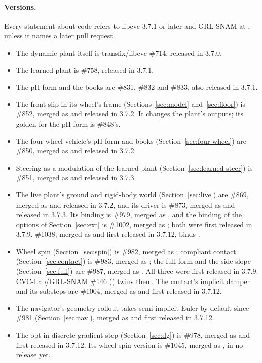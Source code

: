 \documentclass[11pt]{article}
\theoremstyle{remark}
\begin{document}
\paragraph{Versions.} Every statement about code refers to libcvc 3.7.1 or later and GRL-SNAM
 at , unless it names a later pull request.
\begin{itemize}
  \item The dynamic plant itself is transfix/libcvc \#714, released in 3.7.0.
  \item The learned plant is \#758, released in 3.7.1.
  \item The pH form and the books are \#831, \#832 and \#833, also released in 3.7.1.
  \item The front slip in its wheel's frame (Sections~\ref{sec:model} and~\ref{sec:floor}) is
        \#852, merged as  and released in 3.7.2. It changes the plant's outputs;
        its golden for the pH form is \#848's.
  \item The four-wheel vehicle's pH form and books (Section~\ref{sec:four-wheel}) are \#850, merged
        as  and released in 3.7.2.
  \item Steering as a modulation of the learned plant (Section~\ref{sec:learned-steer}) is \#851,
        merged as  and released in 3.7.3.
  \item The live plant's ground and rigid-body world (Section~\ref{sec:live}) are \#869, merged as
         and released in 3.7.2, and its driver is \#873, merged as 
        and released in 3.7.3. Its  binding is \#979, merged as , and
        the binding of the options of Section~\ref{sec:ext} is \#1002, merged as ;
        both were first released in 3.7.9. \#1038, merged as  and first released
        in 3.7.12, binds .
  \item Wheel spin (Section~\ref{sec:spin}) is \#982, merged as ; compliant contact
        (Section~\ref{sec:contact}) is \#983, merged as ; the full form and the side
        slope (Section~\ref{sec:full}) are \#987, merged as . All three were first
        released in 3.7.9. CVC-Lab/GRL-SNAM \#146 () twins them. The contact's
        implicit damper and its substeps are \#1004, merged as  and first released in
        3.7.12.
  \item The navigator's geometry rollout takes semi-implicit Euler by default since \#981
        (Section~\ref{sec:nav}), merged as  and first released in 3.7.12.
  \item The opt-in discrete-gradient step (Section~\ref{sec:dg}) is \#978, merged as
         and first released in 3.7.12. Its wheel-spin version is \#1045, merged as
        , in no release yet.
\end{itemize}
\end{document}
